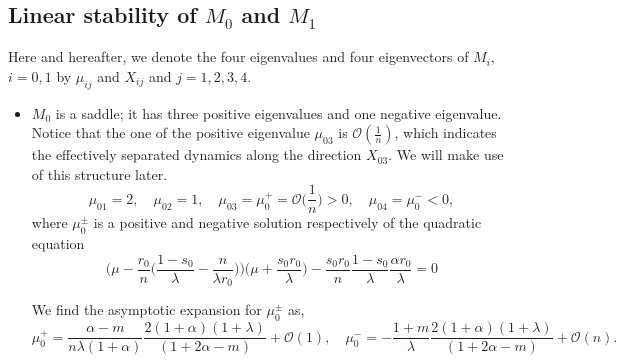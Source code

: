 \documentclass[a4paper,11pt]{article}
\def\BO{{\mathcal{O}}}
\theoremstyle{remark}
\begin{document}
\subsection{Linear stability of $M_0$ and $M_1$}
Here and hereafter, we denote the four eigenvalues and four eigenvectors of $M_i$, $i=0,1$  by $\mu_{ij}$ and $X_{ij}$ and $j=1,2,3,4$.
\begin{itemize}
 \item $M_0$ is a saddle; it has three positive eigenvalues and one negative eigenvalue. Notice that the one of the positive eigenvalue $\mu_{03}$ is $\mathcal{O}( \frac{1}{n})$, which indicates the effectively separated dynamics along the direction $X_{03}$. We will make use of this structure later.
 \begin{equation}
  \mu_{01} = 2, \quad \mu_{02}=1, \quad \mu_{03}=\mu_0^+=\BO\Big(\frac{1}{n}\Big)>0, \quad \mu_{04}=\mu_0^{-}<0,
 \end{equation}
  where $\mu_0^\pm$ is a positive and negative solution respectively of the quadratic equation
 $$ \Big(\mu - \frac{r_0}{n}\Big(\frac{1-s_0}{\lambda}-\frac{n}{\lambda r_0}\Big)\Big)\Big(\mu + \frac{s_0r_0}{\lambda}\Big) - \frac{s_0r_0}{n} \frac{1-s_0}{\lambda}\frac{\alpha r_0}{\lambda} = 0$$

We find the asymptotic expansion for $\mu_0^\pm$ as,
$$\mu_0^+ = \frac{\alpha-m}{n\lambda(1+\alpha)}\frac{2(1+\alpha)(1+\lambda)}{(1+2\alpha-m)}+\BO(1), \quad\mu_0^- = -\frac{1+m}{\lambda}\frac{2(1+\alpha)(1+\lambda)}{(1+2\alpha-m)}  + \BO(n).$$


\end{itemize}
\end{document}
